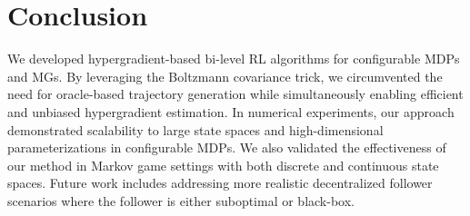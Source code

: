 \documentclass[letterpaper]{article} %
\begin{document}

\section{Conclusion}

We developed hypergradient-based bi-level RL algorithms for configurable MDPs and MGs. 
By leveraging the Boltzmann covariance trick, we circumvented the need for oracle-based trajectory generation while simultaneously enabling efficient and unbiased hypergradient estimation. 
In numerical experiments, our approach demonstrated scalability to large state spaces and high-dimensional parameterizations in configurable MDPs. We also validated the effectiveness of our method in Markov game settings with both discrete and continuous state spaces. 
Future work includes addressing more realistic decentralized follower scenarios where the follower is either suboptimal or black-box.



\end{document}
